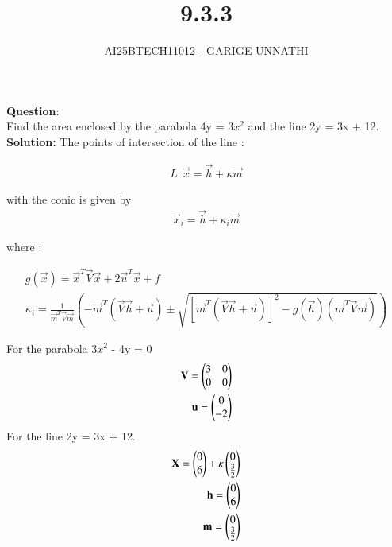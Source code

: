 \documentclass[journal]{IEEEtran}
\begin{document}

\vspace{3cm}

\title{9.3.3}
\author{AI25BTECH11012 - GARIGE UNNATHI}
{\let\newpage\relax\maketitle}


\renewcommand{\thefigure}{\theenumi}
\renewcommand{\thetable}{\theenumi}
\setlength{\intextsep}{10pt} %


\renewcommand{\thetable}{\theenumi}


\textbf{Question}:\\
Find the area enclosed by the parabola 4y = 3$x^2$ and the line 2y = 3x + 12.\\

\textbf{Solution: }
The points of intersection of the line :

\begin{align}
  L : \vec{x} = \vec{h} + \kappa\vec{m}
\end{align}

with the conic  is given by 
\begin{align}
   \vec{x}_i = \vec{h} + \kappa_i\vec{m}
\end{align}

where :

\begin{align*}
 g(\vec{x}) = \vec{x}^{T}\vec{V}\vec{x} + 2\vec{u}^{T}\vec{x} + f\\ 
\kappa_i = \frac{1}
{\vec{m}^{T}\vec{V}\vec{m}}(-\vec{m}^{T}(\vec{V}\vec{h} + \vec{u}) \pm \sqrt{[\vec{m}^{T}(\vec{V}\vec{h}+\vec{u})]^{2} - g(\vec{h})(\vec{m}^{T}\vec{V}\vec{m})})
\end{align*}

For the parabola 3$x^2$ - 4y = 0
\begin{align}
   \mathbf{V} = \begin{pmatrix}3 & 0\\0& 0\end{pmatrix}\\
   \mathbf{u} = \begin{pmatrix}0\\-2\end{pmatrix}
\end{align}
For the line  2y = 3x + 12.
\begin{align}
  \mathbf{X} = \begin{pmatrix}0\\6\end{pmatrix} + \kappa\begin{pmatrix}0 \\ \frac{3}{2}\end{pmatrix}\\
  \mathbf{h} = \begin{pmatrix}0\\6\end{pmatrix}\\
  \mathbf{m} = \begin{pmatrix}0 \\ \frac{3}{2}\end{pmatrix}
\end{align}
\end{document}
